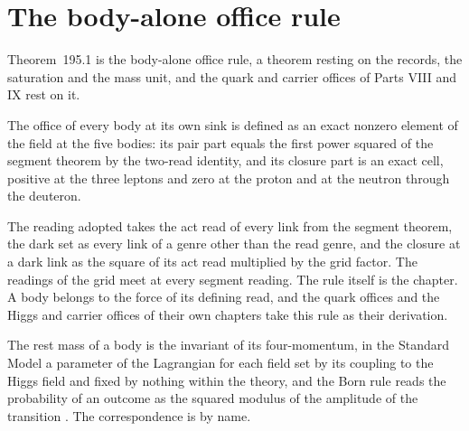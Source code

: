 \section{The body-alone office rule}\label{mod:VIII-2-body-alone-office-rule}
\label{narr:open:8-2}Theorem~195.1 is the body-alone office rule, a theorem resting on the records, the saturation and the mass unit, and the quark and carrier offices of Parts VIII and IX rest on it.
\begin{chtheorem}\label{box:VIII-2-body-alone-office-rule:1}
The office of every body at its own sink is defined as an exact nonzero element of the field at the five bodies: its pair part equals the first power squared of the segment theorem by the two-read identity, and its closure part is an exact cell, positive at the three leptons and zero at the proton and at the neutron through the deuteron.
\end{chtheorem}
The reading adopted takes the act read of every link from the segment theorem, the dark set as every link of a genre other than the read genre, and the closure at a dark link as the square of its act read multiplied by the grid factor. The readings of the grid meet at every segment reading. The rule itself is the chapter. A body belongs to the force of its defining read, and the quark offices and the Higgs and carrier offices of their own chapters take this rule as their derivation.
\begin{chbridge}
The rest mass of a body is the invariant of its four-momentum, in the Standard Model a parameter of the Lagrangian for each field set by its coupling to the Higgs field and fixed by nothing within the theory, and the Born rule reads the probability of an outcome as the squared modulus of the amplitude of the transition \cite{Born1926,Dirac1928,Weinberg1967}. The correspondence is by name.
\end{chbridge}
